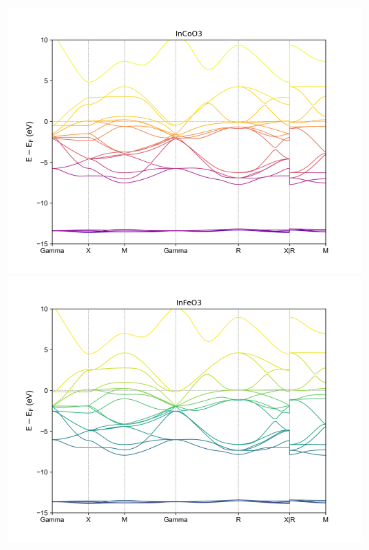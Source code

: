 \documentclass[12pt, letterpaper]{article}
\newcommand*{\1}{\hspace{1pt}}
\begin{document}
%
            

    \begin{adjustbox}{center,caption={Band Structure Of InCoO3 and InFeO3},label={somelabel},nofloat=figure,vspace=\bigskipamount}
        \includegraphics[width=0.7\textwidth]{bandCo}
        \includegraphics[width=0.7\textwidth]{bandFe}
    \end{adjustbox}
\end{document}
